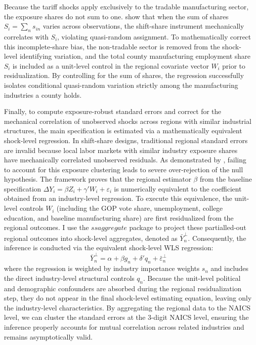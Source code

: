 \documentclass[12pt]{article}
\numberwithin{figure}{section}
\numberwithin{table}{section}
\begin{document}
Because the tariff shocks apply exclusively to the tradable manufacturing sector, the exposure shares do not sum to one. \cite{BHJ2022} show that when the sum of shares $S_i = \sum_n s_{in}$ varies across observations, the shift-share instrument mechanically correlates with $S_i$, violating quasi-random assignment. To mathematically correct this incomplete-share bias, the non-tradable sector is removed from the shock-level identifying variation, and the total county manufacturing employment share $S_i$ is included as a unit-level control in the regional covariate vector $W_i$ prior to residualization. By controlling for the sum of shares, the regression successfully isolates conditional quasi-random variation strictly among the manufacturing industries a county holds.

Finally, to compute exposure-robust standard errors and correct for the mechanical correlation of unobserved shocks across regions with similar industrial structures, the main specification is estimated via a mathematically equivalent shock-level regression. In shift-share designs, traditional regional standard errors are invalid because local labor markets with similar industry exposure shares have mechanically correlated unobserved residuals. As demonstrated by \cite{Adao2019}, failing to account for this exposure clustering leads to severe over-rejection of the null hypothesis. The \cite{BHJ2022} framework proves that the regional estimator $\beta$ from the baseline specification $\Delta Y_i = \beta Z_i + \gamma' W_i + \varepsilon_i$ is numerically equivalent to the coefficient obtained from an industry-level regression. To execute this equivalence, the unit-level controls $W_i$ (including the GOP vote share, unemployment, college education, and baseline manufacturing share) are first residualized from the regional outcomes. I use the $ssaggregate$ package to project these partialled-out regional outcomes into shock-level aggregates, denoted as $\bar{Y}_n^\perp$. Consequently, the inference is conducted via the equivalent shock-level WLS regression:
$$ \bar{Y}_n^\perp = \alpha + \beta g_n + \delta' q_n + \bar{\varepsilon}_n^\perp $$
where the regression is weighted by industry importance weights $s_n$ and includes the direct industry-level structural controls $q_n$. Because the unit-level political and demographic confounders are absorbed during the regional residualization step, they do not appear in the final shock-level estimating equation, leaving only the industry-level characteristics. By aggregating the regional data to the NAICS level, we can cluster the standard errors at the 3-digit NAICS level, ensuring the inference properly accounts for mutual correlation across related industries and remains asymptotically valid.
\end{document}
